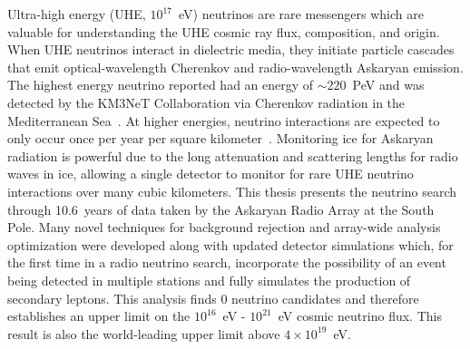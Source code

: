 \vcinfo{}

Ultra-high energy (UHE, $10^{17}$~eV) neutrinos are rare messengers which are valuable for understanding the UHE cosmic ray flux, composition, and origin. 
When UHE neutrinos interact in dielectric media, they initiate particle cascades that emit optical-wavelength Cherenkov and radio-wavelength Askaryan emission.
The highest energy neutrino reported had an energy of $\sim \! 220$~PeV and was detected by the KM3NeT Collaboration via Cherenkov radiation in the Mediterranean Sea~\citep{km3net_neutrino}.
At higher energies, neutrino interactions are expected to only occur once per year per square kilometer~\citep{pdg_review}.
Monitoring ice for Askaryan radiation is powerful due to the long attenuation and scattering lengths for radio waves in ice, allowing a single detector to monitor for rare UHE neutrino interactions over many cubic kilometers. 
This thesis presents the neutrino search through 10.6~years of data taken by the Askaryan Radio Array at the South Pole.
Many novel techniques for background rejection and array-wide analysis optimization were developed along with updated detector simulations which, for the first time in a radio neutrino search, incorporate the possibility of an event being detected in multiple stations and fully simulates the production of secondary leptons. 
This analysis finds 0 neutrino candidates and therefore establishes an upper limit on the $10^{16}$~eV - $10^{21}$~eV cosmic neutrino flux. 
This result is also the world-leading upper limit above $4 \times 10^{19}$~eV. 
